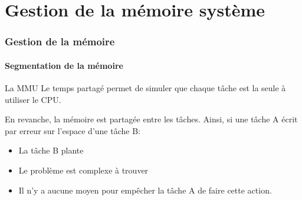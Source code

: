 %
%
%

\part{Gestion de la mémoire système}

\begin{frame}
\partpage
\end{frame}

\begin{frame}
\tableofcontents
\end{frame}


\section{Gestion de la mémoire}

\subsection{Segmentation de la mémoire}

\begin{frame}{La MMU}
  Le temps partagé  permet de simuler que chaque tâche  est la seule à
  utiliser le CPU.

  En revanche, la mémoire est partagée entre les tâches. Ainsi, si une
  tâche A écrit par erreur sur l'espace d'une tâche B:
  \begin{itemize}
  \item  La tâche B plante
  \item  Le problème est complexe à trouver
  \item Il  n'y a  aucune moyen  pour empêcher la  tâche A  de faire
    cette action.
  \end{itemize}
\end{frame}

